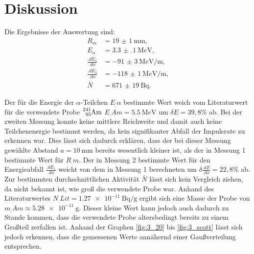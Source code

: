 
\section{Diskussion}
\label{sec:Diskussion}

Die Ergebnisse der Auswertung sind:
\begin{align*}
R_m			&= \SI{19(1)}{\milli\metre}\text{,}\\
E_\alpha 	&= \SI{3.3(1)}{\mega e\volt}\text{,}\\
\frac{.dE_1}{.dx}	&= \SI{-91(3)}{\mega e\volt\per\metre}\text{,}\\
\frac{.dE_2}{.dx}	&= \SI{-118(1)}{\mega e\volt\per\metre}\text{,}\\
\bar{N}		&= \SI{671(19)}{\becquerel} \text{.}
\end{align*}

Der für die Energie der $\alpha$-Teilchen $E_.{\alpha}$ bestimmte Wert weich vom Literaturwert für die verwendete Probe $\ce{^{241}_{95}Am}$
$E_.{Am} = \SI{5,5}{\mega e\volt}$\cite{Americium-241} um $\delta E = 39,8\%$ ab.
Bei der zweiten Messung konnte keine mittlere Reichweite und damit auch keine Teilchenenergie bestimmt werden, da kein signifikanter Abfall der Impulsrate zu erkennen war. Dies lässt sich dadurch erklären, dass der bei dieser Messung gewählte Abstand $a=\SI{10}{\milli\metre}$ bereits wesentlich kleiner ist, als der in Messung 1 bestimmte Wert für $R_.m$.
Der in Messung 2 bestimmte Wert für den Energieabfall $\frac{.dE_1}{.dx}$ weicht von dem in Messung 1 berechneten um $\delta \frac{.dE}{.dx}= 22,8\%$ ab.
Zur bestimmten durchschnittlichen Aktivität $\bar{N}$ lässt sich kein Vergleich ziehen, da nicht bekannt ist, wie groß die verwendete Probe war.
Anhand des Literaturwertes $N_.{Lit}=\SI{1,27e-11}{\becquerel\per\gram}$\cite{Americium-241} ergibt sich eine Masse der Probe von $m_.{Am}\approx \SI{5,28e-11}{\gram}$. Dieser kleine Wert kann jedoch auch dadurch zu Stande kommen, dass die verwendete Probe altersbedingt bereits zu einem Großteil zerfallen ist.
Anhand der Graphen \ref{fig:3_20} bis \ref{fig:3_scott} lässt sich jedoch erkennen, dass die gemessenen Werte annähernd einer Gaußverteilung entsprechen.
